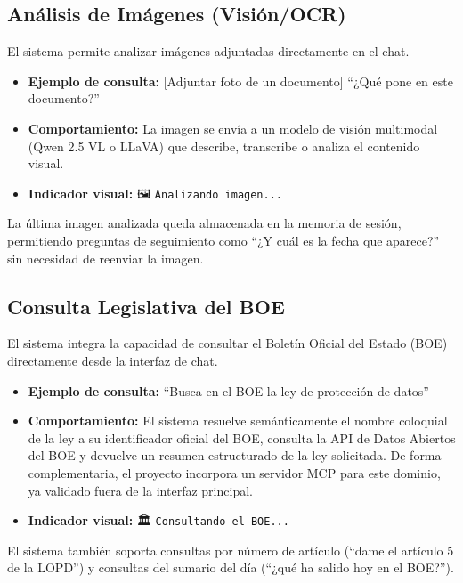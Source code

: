 \subsection{Análisis de Imágenes (Visión/OCR)}
\label{subsec:modo-vision}

El sistema permite analizar imágenes adjuntadas directamente en el chat.

\begin{itemize}
    \item \textbf{Ejemplo de consulta:} [Adjuntar foto de un documento] ``¿Qué pone en este documento?''
    \item \textbf{Comportamiento:} La imagen se envía a un modelo de visión multimodal (Qwen 2.5 VL o LLaVA) que describe, transcribe o analiza el contenido visual.
    \item \textbf{Indicador visual:} 🖼️ \texttt{Analizando imagen...}
\end{itemize}

La última imagen analizada queda almacenada en la memoria de sesión, permitiendo preguntas de seguimiento como ``¿Y cuál es la fecha que aparece?'' sin necesidad de reenviar la imagen.

\subsection{Consulta Legislativa del BOE}
\label{subsec:modo-boe}

El sistema integra la capacidad de consultar el Boletín Oficial del Estado (BOE) directamente desde la interfaz de chat.

\begin{itemize}
    \item \textbf{Ejemplo de consulta:} ``Busca en el BOE la ley de protección de datos''
    \item \textbf{Comportamiento:} El sistema resuelve semánticamente el nombre coloquial de la ley a su identificador oficial del BOE, consulta la API de Datos Abiertos del BOE y devuelve un resumen estructurado de la ley solicitada. De forma complementaria, el proyecto incorpora un servidor MCP para este dominio, ya validado fuera de la interfaz principal.
    \item \textbf{Indicador visual:} 🏛️ \texttt{Consultando el BOE...}
\end{itemize}

El sistema también soporta consultas por número de artículo (``dame el artículo 5 de la LOPD'') y consultas del sumario del día (``¿qué ha salido hoy en el BOE?'').

